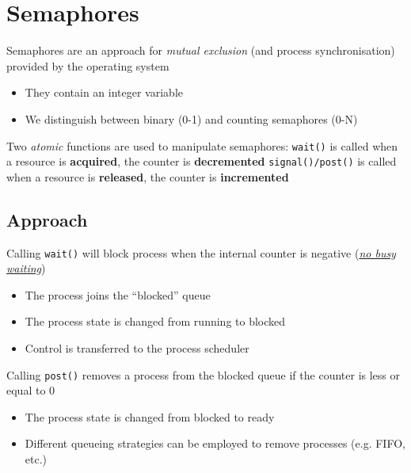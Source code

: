 \documentclass{article}
\newcommand{\worddef}[1]{\hyperref[sec:reference]{\textit{#1}}}
\begin{document}
\section{Semaphores}
\begin{flushleft}
Semaphores are an approach for \textit{mutual exclusion} (and process synchronisation) provided by the operating system 
\begin{itemize}
	\item They contain an integer variable 
	\item We distinguish between binary (0-1) and counting semaphores (0-N)
\end{itemize}
Two \textit{atomic} functions are used to manipulate semaphores: \texttt{wait()} is called when a resource is \textbf{acquired}, the counter is \textbf{decremented} \texttt{signal()/post()} is called when a resource is \textbf{released}, the counter is \textbf{incremented}
\end{flushleft}

\subsection{Approach}
\begin{flushleft}
Calling \texttt{wait()} will block process when the internal counter is negative (\worddef{no busy waiting})
\begin{itemize}
	\item The process joins the “blocked” queue 
	\item The process state is changed from running to blocked
	\item Control is transferred to the process scheduler
\end{itemize}
Calling \texttt{post()} removes a process from the blocked queue if the counter is less or equal to 0
\begin{itemize}
	\item The process state is changed from blocked to ready
	\item Different queueing strategies can be employed to remove processes (e.g. FIFO, etc.)
\end{itemize}
\end{flushleft}
\end{document}
